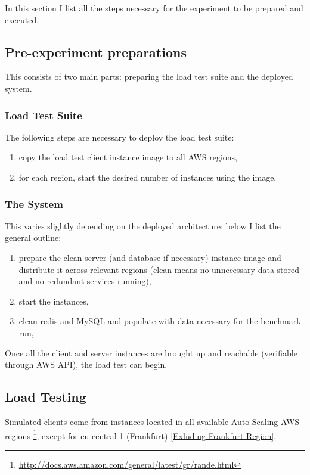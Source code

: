 \documentclass{uvamscse}
\begin{document}
In this section I list all the steps necessary for the experiment to be prepared and executed.

\subsection{Pre-experiment preparations}

This consists of two main parts: preparing the load test suite and the deployed system.

\subsubsection{Load Test Suite}

The following steps are necessary to deploy the load test suite:
\begin{enumerate}
  \item copy the load test client instance image to all AWS regions,
  \item for each region, start the desired number of instances using the image.
\end{enumerate}

\subsubsection{The System}

This varies slightly depending on the deployed architecture; below I list the general outline:
\begin{enumerate}
  \item prepare the clean server (and database if necessary) instance image and distribute it across relevant regions (clean means no unnecessary data stored and no redundant services running),
  \item start the instances,
  \item clean redis and MySQL and populate with data necessary for the benchmark run,
\end{enumerate}

Once all the client and server instances are brought up and reachable (verifiable through AWS API), the load test can begin.

\subsection{Load Testing}\label{Load Testing}

Simulated clients come from instances located in all available Auto-Scaling AWS regions \footnote{\url{http://docs.aws.amazon.com/general/latest/gr/rande.html}}, except for eu-central-1 (Frankfurt) \ref{Exluding Frankfurt Region}.
\end{document}
